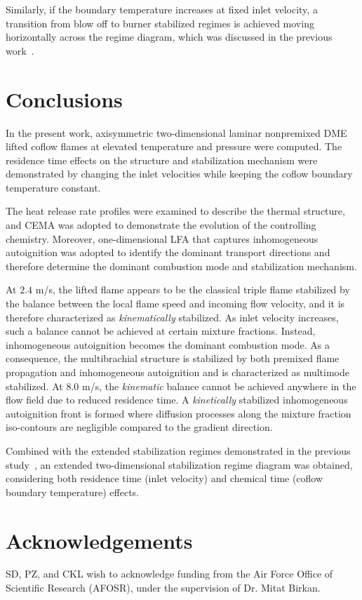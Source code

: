 \documentclass{wssci}
\begin{document}
Similarly, if the boundary temperature increases at fixed inlet velocity, a transition from blow off to burner stabilized regimes is achieved moving horizontally across the regime diagram, which was discussed in the previous work~\cite{deng15}.     


\section{Conclusions}

In the present work, axisymmetric two-dimensional laminar nonpremixed DME lifted coflow flames at elevated temperature and pressure were computed.  The residence time effects on the structure and stabilization mechanism were demonstrated by changing the inlet velocities while keeping the coflow boundary temperature constant.

The heat release rate profiles were examined to describe the thermal structure, and CEMA was adopted to demonstrate the evolution of the controlling chemistry.  Moreover, one-dimensional LFA that captures inhomogeneous autoignition was adopted to identify the dominant transport directions and therefore determine the dominant combustion mode and stabilization mechanism.

At $2.4$ m/s, the lifted flame appears to be the classical triple flame stabilized by the balance between the local flame speed and incoming flow velocity, and it is therefore characterized as \emph {kinematically} stabilized.  As inlet velocity increases, such a balance cannot be achieved at certain mixture fractions.  Instead, inhomogeneous autoignition becomes the dominant combustion mode.  As a consequence, the multibrachial structure is stabilized by both premixed flame propagation and inhomogeneous autoignition and is characterized as multimode stabilized.  At $8.0$ m/s, the \emph{kinematic} balance cannot be achieved anywhere in the flow field due to reduced residence time.  A \emph {kinetically} stabilized inhomogeneous autoignition front is formed where diffusion processes along the mixture fraction iso-contours are negligible compared to the gradient direction.

Combined with the extended stabilization regimes demonstrated in the previous study~\cite{deng15}, an extended two-dimensional stabilization regime diagram was obtained, considering both residence time (inlet velocity) and chemical time (coflow boundary temperature) effects.  


\section{Acknowledgements}

SD, PZ, and CKL wish to acknowledge funding from the Air Force Office of Scientific Research (AFOSR), under the supervision of Dr. Mitat Birkan.


 
\end{document}
